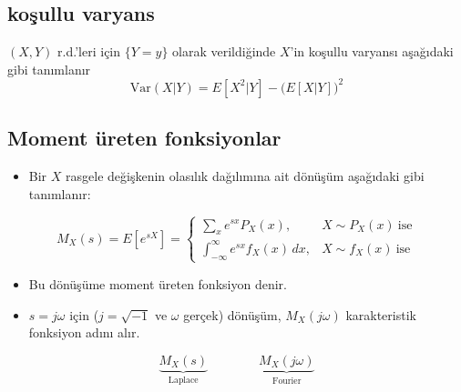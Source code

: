 \documentclass[11pt,a4paper]{article}
\begin{document}
\subsection{koşullu varyans}
$(X,Y)$ r.d.'leri için $\{Y=y\}$ olarak verildiğinde $X$'in koşullu varyansı aşağıdaki gibi tanımlanır
\[ \mathrm{Var}(X|Y)=E[X^2|Y]-\big(E[X|Y]\big)^2 \]

\subsection{Moment üreten fonksiyonlar}
\begin{itemize}
  \item Bir $X$ rasgele değişkenin olasılık dağılımına ait dönüşüm aşağıdaki gibi tanımlanır:
\end{itemize}
\[ M_X(s)=E[e^{sX}]=\begin{cases}\displaystyle\sum_{x}e^{sx}P_X(x), & X\sim P_X(x)\ \text{ise}\\[4mm] \displaystyle\int_{-\infty}^{\infty}e^{sx}f_X(x)\,dx, & X\sim f_X(x)\ \text{ise}\end{cases} \]
\begin{itemize}
  \item Bu dönüşüme moment üreten fonksiyon denir.
  \item $s=j\omega$ için ($j=\sqrt{-1}$ ve $\omega$ gerçek) dönüşüm, $M_X(j\omega)$ karakteristik fonksiyon adını alır.
\end{itemize}
\[ \underbrace{M_X(s)}_{\text{Laplace}}\qquad\qquad \underbrace{M_X(j\omega)}_{\text{Fourier}} \]
\end{document}
